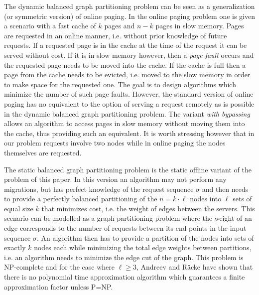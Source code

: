 \documentclass[a4paper,UKenglish,cleveref, autoref, thm-restate,authorcolumns]{lipics-v2019}
\begin{document}
The dynamic balanced graph partitioning problem 
can be seen as a generalization (or symmetric version) of online paging.
In the online paging problem \cite{Epstein2011,Fiat2002}
 one is given a scenario with a fast cache of $k$ pages and $n-k$ pages in slow memory. Pages are requested in an online manner, i.e. without prior knowledge of future requests. If a requested page is in the cache at the time of the request it can be served without cost. If it is in slow memory however, then a \textit{page fault} occurs and the requested page needs to be moved into the cache. If the cache is full then a page from the cache needs to be evicted, i.e. moved to the slow memory in order to make space for the requested one. The goal is to design algorithms which minimize the number of such page faults.
However, the standard version of online paging has no equivalent to the option of serving a request remotely as is possible in the dynamic balanced graph partitioning problem. The variant \textit{with bypassing} allows an algorithm to access pages in slow memory without moving them into the cache, thus providing such an equivalent. It is worth stressing however that in our problem requests involve two nodes while in online paging the nodes themselves are requested.

The static balanced graph partitioning problem is the static offline variant of the problem of this paper. In this version an algorithm may not perform any migrations, but has perfect knowledge of the request sequence $\sigma$ and then needs to provide a perfectly balanced partitioning of the $n=k\cdot \ell$ nodes into $\ell$ sets of equal size $k$ that minimizes cost, i.e. the weight of edges between the servers. This scenario can be modelled as a graph partitioning problem where the weight of an edge corresponds to the number of requests between its end points in the input sequence $\sigma$. 
An algorithm then has to provide a partition of the nodes into sets of exactly $k$ nodes each while minimizing the total edge weights between partitions, i.e. an algorithm needs to minimize the edge cut of the graph.  
This problem is NP-complete and for the case where $\ell\geq 3$, Andreev and R\"acke \cite{Andreev2006} have shown that there is no polynomial time approximation algorithm which guarantees a finite approximation factor unless P=NP.
\end{document}
